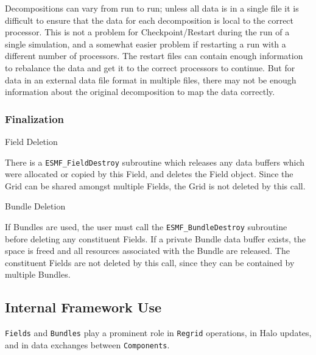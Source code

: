 \begin{description}
\begin{description}
Decompositions can vary from run to run; unless all data
is in a single file it is difficult to ensure that the data for
each decomposition is local to the correct processor.  This is
not a problem for Checkpoint/Restart during the run of a
single simulation, and a somewhat easier problem if restarting
a run with a different number of processors.  The restart files
can contain enough information to rebalance the data and get it
to the correct processors to continue.  But for data in an 
external data file format in multiple files, 
there may not be enough information about the original decomposition
to map the data correctly.

\end{description}

\end{description}

\subsubsection{Finalization}

\begin{description}

\item{Field Deletion}

There is a {\tt ESMF\_FieldDestroy} subroutine which releases
any data buffers which were allocated or copied by this Field,
and deletes the Field object.  Since the Grid can be shared
amongst multiple Fields, the Grid is not deleted by this call.

\item{Bundle Deletion}

If Bundles are used, the user must call the 
{\tt ESMF\_BundleDestroy} subroutine before deleting any constituent
Fields.  If a private Bundle data buffer exists, the space is
freed and all resources associated with the Bundle are released.
The constituent Fields are not deleted by this call, since they
can be contained by multiple Bundles.

\end{description}


\subsection{Internal Framework Use}

{\tt Fields} and {\tt Bundles} play a prominent role in {\tt Regrid} 
operations, in Halo updates,  
and in data exchanges between {\tt Components}.

